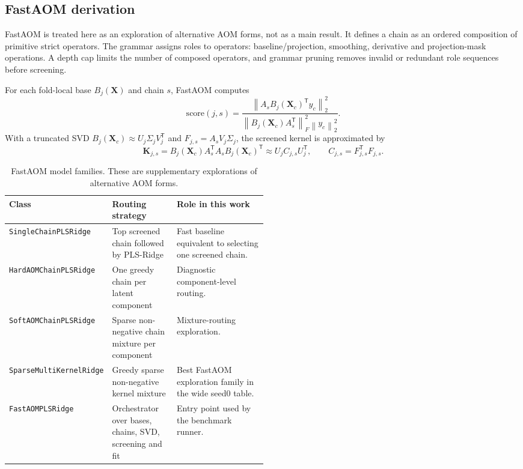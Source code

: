 \documentclass[11pt,a4paper]{article}
\newcommand{\X}{\mathbf{X}}
\newcommand{\K}{\mathbf{K}}
\newcommand{\transpose}{^{\mathsf T}}
\newcommand{\code}[1]{\nolinkurl{#1}}
\begin{document}
\subsection{FastAOM derivation}

FastAOM is treated here as an exploration of alternative AOM forms, not as a
main result.  It defines a chain as an ordered composition of primitive
strict operators.  The grammar assigns roles to operators:
baseline/projection, smoothing, derivative and projection-mask operations.  A
depth cap limits the number of composed operators, and grammar pruning removes
invalid or redundant role sequences before screening.

For each fold-local base $B_j(\X)$ and chain $s$, FastAOM computes
\begin{equation}
  \mathrm{score}(j,s)
  =
  \frac{\left\|A_s B_j(\X_c)\transpose y_c\right\|_2^2}
       {\left\|B_j(\X_c)A_s\transpose\right\|_F^2
        \left\|y_c\right\|_2^2}.
\end{equation}
With a truncated SVD $B_j(\X_c)\approx U_j\Sigma_jV_j\transpose$ and
$F_{j,s}=A_sV_j\Sigma_j$, the screened kernel is approximated by
\begin{equation}
  \K_{j,s}
  =
  B_j(\X_c)A_s\transpose A_s B_j(\X_c)\transpose
  \approx U_j C_{j,s}U_j\transpose,
  \qquad
  C_{j,s}=F_{j,s}\transpose F_{j,s}.
\end{equation}

\begin{table}[h]
\centering
\caption{FastAOM model families.  These are supplementary explorations of
alternative AOM forms.}
\small
\begin{tabularx}{\linewidth}{p{0.25\linewidth}p{0.25\linewidth}X}
\toprule
Class & Routing strategy & Role in this work \\
\midrule
\code{SingleChainPLSRidge} & Top screened chain followed by PLS-Ridge &
Fast baseline equivalent to selecting one screened chain.\\
\code{HardAOMChainPLSRidge} & One greedy chain per latent component &
Diagnostic component-level routing.\\
\code{SoftAOMChainPLSRidge} & Sparse non-negative chain mixture per component &
Mixture-routing exploration.\\
\code{SparseMultiKernelRidge} & Greedy sparse non-negative kernel mixture &
Best FastAOM exploration family in the wide seed0 table.\\
\code{FastAOMPLSRidge} & Orchestrator over bases, chains, SVD, screening and fit &
Entry point used by the benchmark runner.\\
\bottomrule
\end{tabularx}
\end{table}
\end{document}
